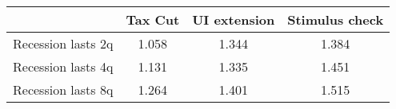 \begin{tabular}{@{}lccc@{}} 
\toprule 
& Tax Cut    & UI extension    & Stimulus check    \\  \midrule 
Recession lasts 2q &1.058  & 1.344  & 1.384     \\ 
Recession lasts 4q &1.131  & 1.335  & 1.451     \\ 
Recession lasts 8q &1.264  & 1.401  & 1.515     \\ 
\end{tabular}  
